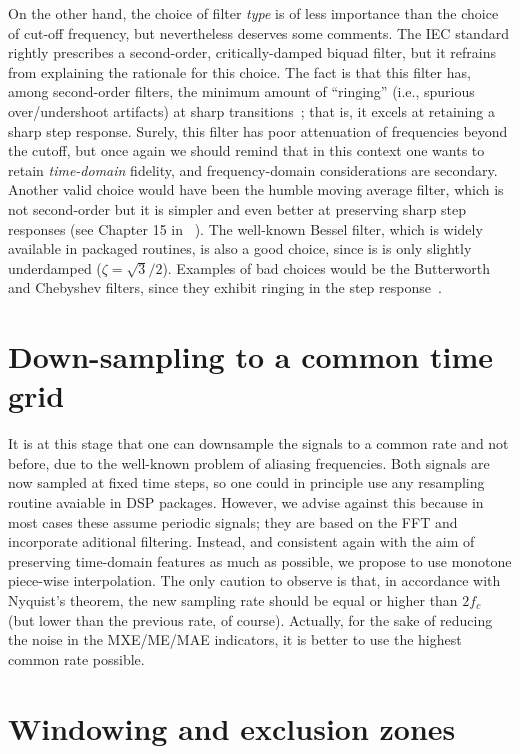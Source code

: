 \documentclass[11pt, a4paper, twoside, titlepage]{article}
\begin{document}
On the other hand, the choice of filter \emph{type} is of less importance than
the choice of cut-off frequency, but nevertheless deserves some comments. The
IEC standard rightly prescribes a second-order, critically-damped biquad filter,
but it refrains from explaining the rationale for this choice. The fact is that
this filter has, among second-order filters, the minimum amount of ``ringing''
(i.e., spurious over/undershoot artifacts) at sharp
transitions~\cite{Smith99,Robertson03}; that is, it excels at retaining a sharp
step response. Surely, this filter has poor attenuation of frequencies beyond
the cutoff, but once again we should remind that in this context one wants to
retain \emph{time-domain} fidelity, and frequency-domain considerations are
secondary.  Another valid choice would have been the humble moving average
filter, which is not second-order but it is simpler and even better at
preserving sharp step responses (see Chapter 15 in ~\cite{Smith99}).  The
well-known Bessel filter, which is widely available in packaged routines, is
also a good choice, since is is only slightly underdamped ($\zeta=\sqrt{3}/2$).
Examples of bad choices would be the Butterworth and Chebyshev filters, since
they exhibit ringing in the step response~\cite{Smith99}.


\section{Down-sampling to a common time grid}

It is at this stage that one can downsample the signals to a common rate and not
before, due to the well-known problem of aliasing frequencies.  Both signals are
now sampled at fixed time steps, so one could in principle use any resampling
routine avaiable in DSP packages. However, we advise against this because in
most cases these assume periodic signals; they are based on the FFT and
incorporate aditional filtering.  Instead, and consistent again with the aim of
preserving time-domain features as much as possible, we propose to use monotone
piece-wise interpolation.  The only caution to observe is that, in accordance
with Nyquist's theorem, the new sampling rate should be equal or higher than
$2f_c$ (but lower than the previous rate, of course). Actually, for the sake of
reducing the noise in the MXE/ME/MAE indicators, it is better to use the highest
common rate possible.


\section{Windowing and exclusion zones}
\end{document}
